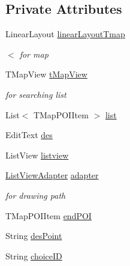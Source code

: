 \subsection*{Private Attributes}
\begin{DoxyCompactItemize}
\item 
Linear\+Layout \mbox{\hyperlink{classhi_1_1world_1_1hello_1_1myapplication_1_1_main_activity_abfcc5b800516c10b908dab8b1fbd5d54}{linear\+Layout\+Tmap}}
\begin{DoxyCompactList}\small\item\em $<$ for map \end{DoxyCompactList}\item 
T\+Map\+View \mbox{\hyperlink{classhi_1_1world_1_1hello_1_1myapplication_1_1_main_activity_a99006b1a0a4da0f230364e38d46f1741}{t\+Map\+View}}
\begin{DoxyCompactList}\small\item\em for searching list \end{DoxyCompactList}\item 
List$<$ T\+Map\+P\+O\+I\+Item $>$ \mbox{\hyperlink{classhi_1_1world_1_1hello_1_1myapplication_1_1_main_activity_af34226e93d680381ae4359390f4d4619}{list}}
\item 
Edit\+Text \mbox{\hyperlink{classhi_1_1world_1_1hello_1_1myapplication_1_1_main_activity_ae4e19845460c49ff2335322cda069b98}{des}}
\item 
List\+View \mbox{\hyperlink{classhi_1_1world_1_1hello_1_1myapplication_1_1_main_activity_a3efc5f0f287cae318a86c62aa4473bbf}{listview}}
\item 
\mbox{\hyperlink{classhi_1_1world_1_1hello_1_1myapplication_1_1_list_view_adapter}{List\+View\+Adapter}} \mbox{\hyperlink{classhi_1_1world_1_1hello_1_1myapplication_1_1_main_activity_ad2fa60df06a89055083e8a43514ad05f}{adapter}}
\begin{DoxyCompactList}\small\item\em for drawing path \end{DoxyCompactList}\item 
T\+Map\+P\+O\+I\+Item \mbox{\hyperlink{classhi_1_1world_1_1hello_1_1myapplication_1_1_main_activity_a2e6977b6c63e3fa7c0d09c5dfd43ed07}{end\+P\+OI}}
\item 
String \mbox{\hyperlink{classhi_1_1world_1_1hello_1_1myapplication_1_1_main_activity_a780189912c7f80c1cce12225cf28ba78}{des\+Point}}
\item 
String \mbox{\hyperlink{classhi_1_1world_1_1hello_1_1myapplication_1_1_main_activity_ae4f7327ca71f7eddd92a5a6233d50f64}{choice\+ID}}

\end{DoxyCompactItemize}
